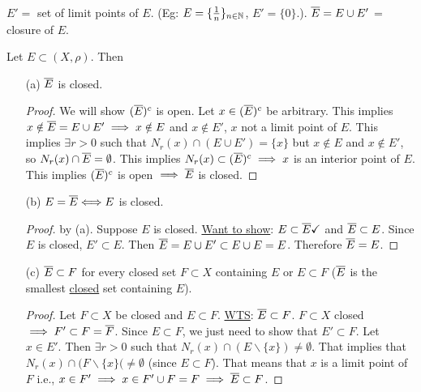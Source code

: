 \documentclass[]{article}
\begin{document}
\begin{recall}
	$E' = $ set of limit points of $E$. (Eg: $E = \{\frac{1}{n}\}_{n\in\mathbb{N}}$, $E' = \{0\}$.). $\overline{E} = E\cup E'$ = closure of $E$.
\end{recall}
\begin{theorem}
	Let $E\subset(X,\rho)$. Then
	\begin{enumerate}
		\item[(a)] $\overline{E}$ is closed.
			\begin{proof}
				We will show $(\overline{E})^c$ is open. Let $x\in (\overline{E})^c$ be arbitrary. 
				This implies $x\notin \overline{E} = E\cup E' \implies x\notin E$ and $x\notin E'$, $x$ not a limit point of $E$.
				This implies $\exists r>0$ such that $N_r(x)\cap (E\cup E') = \{x\}$ but $x\notin E$ and $x\notin E'$, so $N_r(x)\cap \overline{E} = \emptyset$.
				This implies $N_r(x)\subset (\overline{E})^c \implies x$ is an interior point of $E$. This implies $(\overline{E})^c$ is open $\implies \overline{E}$ is closed.
			\end{proof}
		\item[(b)] $E = \overline{E} \Longleftrightarrow E$ is closed.
			\begin{proof}
				\say{$\implies$} by (a).
				\say{$\Lla$} Suppose $E$ is closed.
				\ul{Want to show}: $E\subset \overline{E}\checkmark$ and $\overline{E}\subset E$.
				Since $E$ is closed, $E'\subset E$. Then $\overline{E} = E\cup E'\subset E\cup E = E$. Therefore $\overline{E} = E$.
			\end{proof}
		\item[(c)] $\overline{E}\subset F$ for every closed set $F\subset X$ containing $E$ or $E\subset F$ ($\overline{E}$ is the smallest \ul{closed} set containing $E$).
			\begin{proof}
				Let $F\subset X$ be closed and $E\subset F$.
				\ul{WTS}: $\overline{E} \subset F$.
				$F\subset X$ closed $\implies F'\subset F = \overline{F}$. Since $E\subset F$, we just need to show that $E'\subset F$.
				Let $x\in E'$. Then $\exists r>0$ such that $N_r(x)\cap (E\backslash\{x\})\neq \emptyset$.
				That implies that $N_r(x)\cap(F\backslash\{x\}(\neq \emptyset$ (since $E\subset F$).
				That means that $x$ is a limit point of $F$ i.e., $x\in F' \implies x\in F'\cup F = F \implies \overline{E} \subset F$.
			\end{proof}
	\end{enumerate}
\end{theorem}
\end{document}
